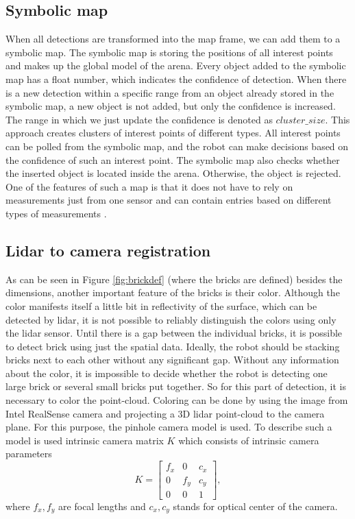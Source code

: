 \subsection{Symbolic map}
When all detections are transformed into the map frame, we can add them to a symbolic map. The symbolic map is storing the positions of all interest points and makes up the global model of the arena. Every object added to the symbolic map has a float number, which indicates the confidence of detection. When there is a new detection within a specific range from an object already stored in the symbolic map, a new object is not added, but only the confidence is increased. The range in which we just update the confidence is denoted as $cluster\_size$. This approach creates clusters of interest points of different types. All interest points can be polled from the symbolic map, and the robot can make decisions based on the confidence of such an interest point. The symbolic map also checks whether the inserted object is located inside the arena. Otherwise, the object is rejected. One of the features of such a map is that it does not have to rely on measurements just from one sensor and can contain entries based on different types of measurements \cite{majer2019}.

\subsection{Lidar to camera registration}
As can be seen in Figure \ref{fig:brickdef} (where the bricks are defined) besides the dimensions, another important feature of the bricks is their color. Although the color manifests itself a little bit in reflectivity of the surface, which can be detected by lidar, it is not possible to reliably distinguish the colors using only the lidar sensor. Until there is a gap between the individual bricks, it is possible to detect brick using just the spatial data. Ideally, the robot should be stacking bricks next to each other without any significant gap. Without any information about the color, it is impossible to decide whether the robot is detecting one large brick or several small bricks put together. So for this part of detection, it is necessary to color the point-cloud. Coloring can be done by using the image from Intel RealSense camera and projecting a 3D lidar point-cloud to the camera plane. For this purpose, the pinhole camera model is used. To describe such a model is used intrinsic camera matrix $K$ which consists of intrinsic camera parameters \cite{hartley2017}
\begin{equation}
K = \begin{bmatrix}
f_x & 0 & c_x \\
0 & f_y & c_y \\
0 & 0 & 1
\end{bmatrix},
\end{equation}
where $f_x, f_y$ are focal lengths and $c_x, c_y$ stands for optical center of the camera.

